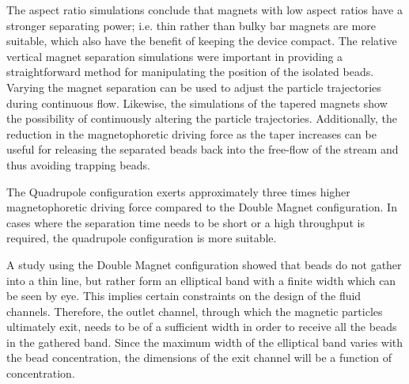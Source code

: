 The aspect ratio simulations conclude that magnets with low aspect ratios have a stronger separating power; i.e. thin rather than bulky bar magnets are more suitable, which also have the benefit of keeping the device compact. The relative vertical magnet separation simulations were important in providing a straightforward method for manipulating the position of the isolated beads. Varying the magnet separation can be used to adjust the particle trajectories during continuous flow. Likewise, the simulations of the tapered magnets show the possibility of continuously altering the particle trajectories. Additionally, the reduction in the magnetophoretic driving force as the taper increases can be useful for releasing the separated beads back into the free-flow of the stream and thus avoiding trapping beads.

The Quadrupole configuration exerts approximately three times higher magnetophoretic driving force compared to the Double Magnet configuration. In cases where the separation time needs to be short or a high throughput is required, the quadrupole configuration is more suitable. 

A study using the Double Magnet configuration showed that beads do not gather into a thin line, but rather form an elliptical band with a finite width which can be seen by eye. This implies certain constraints on the design of the fluid channels. Therefore, the outlet channel, through which the magnetic particles ultimately exit, needs to be of a sufficient width in order to receive all the beads in the gathered band. Since the maximum width of the elliptical band varies with the bead concentration, the dimensions of the exit channel will be a function of concentration. 

